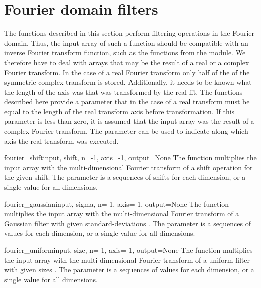 \section{Fourier domain filters}
The functions described in this section perform filtering operations in the
Fourier domain. Thus, the input array of such a function should be 
compatible with an inverse Fourier transform function, such as the 
functions from the  module. We therefore have to deal 
with arrays that may be the result of a real or a complex Fourier 
transform. In the case of a real Fourier transform only half of the of the 
symmetric complex transform is stored. Additionally, it needs to be known 
what the length of the axis was that was transformed by the real fft.  The 
functions described here provide a parameter  that in the case of a 
real transform must be equal to the length of the real transform axis 
before transformation. If this parameter is less than zero, it is assumed 
that the input array was the result of a complex Fourier transform. The 
parameter  can be used to indicate along which axis the real 
transform was executed.

\begin{funcdesc}{fourier_shift}{input, shift, n=-1, axis=-1, output=None}
  The  function multiplies the input array with the
  multi-dimensional Fourier transform of a shift operation for the given 
  shift. The  parameter is a sequences of shifts for each 
  dimension, or a single value for all dimensions.
\end{funcdesc}

\begin{funcdesc}{fourier_gaussian}{input, sigma, n=-1, axis=-1, output=None}
  The  function multiplies the input array with 
  the multi-dimensional Fourier transform of a Gaussian filter with given
  standard-deviations . The  parameter is a sequences 
  of values for each dimension, or a single value for all dimensions.
\end{funcdesc}

\begin{funcdesc}{fourier_uniform}{input, size, n=-1, axis=-1, output=None}
  The  function multiplies the input array with 
  the multi-dimensional Fourier transform of a uniform filter with given
  sizes . The  parameter is a sequences of
  values for each dimension, or a single value for all dimensions.
\end{funcdesc}

